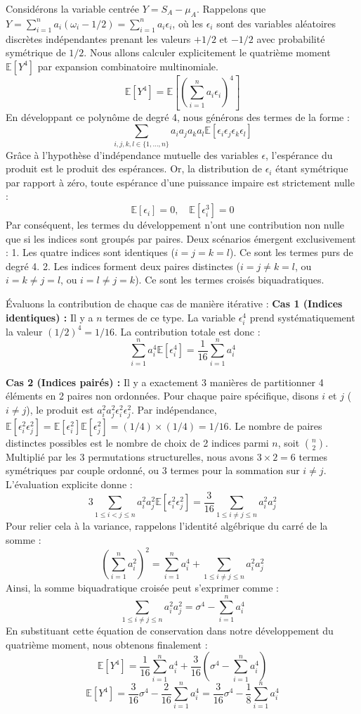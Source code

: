 \documentclass[12pt,a4paper]{article}
\begin{document}
Considérons la variable centrée $Y = S_A - \mu_A$.
Rappelons que $Y = \sum_{i=1}^n a_i (\omega_i - 1/2) = \sum_{i=1}^n a_i \epsilon_i$, où les $\epsilon_i$ sont des variables aléatoires discrètes indépendantes prenant les valeurs $+1/2$ et $-1/2$ avec probabilité symétrique de $1/2$.
Nous allons calculer explicitement le quatrième moment $\mathbb{E}[Y^4]$ par expansion combinatoire multinomiale.
$$ \mathbb{E}[Y^4] = \mathbb{E}\left[ \left( \sum_{i=1}^n a_i \epsilon_i \right)^4 \right] $$
En développant ce polynôme de degré 4, nous générons des termes de la forme :
$$ \sum_{i,j,k,l \in \{1,\dots,n\}} a_i a_j a_k a_l \mathbb{E}[\epsilon_i \epsilon_j \epsilon_k \epsilon_l] $$
Grâce à l'hypothèse d'indépendance mutuelle des variables $\epsilon$, l'espérance du produit est le produit des espérances. Or, la distribution de $\epsilon_i$ étant symétrique par rapport à zéro, toute espérance d'une puissance impaire est strictement nulle :
$$ \mathbb{E}[\epsilon_i] = 0, \quad \mathbb{E}[\epsilon_i^3] = 0 $$
Par conséquent, les termes du développement n'ont une contribution non nulle que si les indices sont groupés par paires. Deux scénarios émergent exclusivement :
1. Les quatre indices sont identiques ($i=j=k=l$). Ce sont les termes purs de degré 4.
2. Les indices forment deux paires distinctes ($i=j \neq k=l$, ou $i=k \neq j=l$, ou $i=l \neq j=k$). Ce sont les termes croisés biquadratiques.

Évaluons la contribution de chaque cas de manière itérative :
\textbf{Cas 1 (Indices identiques) :} Il y a $n$ termes de ce type. La variable $\epsilon_i^4$ prend systématiquement la valeur $(1/2)^4 = 1/16$.
La contribution totale est donc :
$$ \sum_{i=1}^n a_i^4 \mathbb{E}[\epsilon_i^4] = \frac{1}{16} \sum_{i=1}^n a_i^4 $$

\textbf{Cas 2 (Indices pairés) :} Il y a exactement 3 manières de partitionner 4 éléments en 2 paires non ordonnées. Pour chaque paire spécifique, disons $i$ et $j$ ($i \neq j$), le produit est $a_i^2 a_j^2 \epsilon_i^2 \epsilon_j^2$.
Par indépendance, $\mathbb{E}[\epsilon_i^2 \epsilon_j^2] = \mathbb{E}[\epsilon_i^2] \mathbb{E}[\epsilon_j^2] = (1/4) \times (1/4) = 1/16$.
Le nombre de paires distinctes possibles est le nombre de choix de 2 indices parmi $n$, soit $\binom{n}{2}$. Multiplié par les 3 permutations structurelles, nous avons $3 \times 2 = 6$ termes symétriques par couple ordonné, ou $3$ termes pour la sommation sur $i \neq j$.
L'évaluation explicite donne :
$$ 3 \sum_{1 \le i < j \le n} a_i^2 a_j^2 \mathbb{E}[\epsilon_i^2 \epsilon_j^2] = \frac{3}{16} \sum_{1 \le i \neq j \le n} a_i^2 a_j^2 $$
Pour relier cela à la variance, rappelons l'identité algébrique du carré de la somme :
$$ \left( \sum_{i=1}^n a_i^2 \right)^2 = \sum_{i=1}^n a_i^4 + \sum_{1 \le i \neq j \le n} a_i^2 a_j^2 $$
Ainsi, la somme biquadratique croisée peut s'exprimer comme :
$$ \sum_{1 \le i \neq j \le n} a_i^2 a_j^2 = \sigma^4 - \sum_{i=1}^n a_i^4 $$
En substituant cette équation de conservation dans notre développement du quatrième moment, nous obtenons finalement :
$$ \mathbb{E}[Y^4] = \frac{1}{16} \sum_{i=1}^n a_i^4 + \frac{3}{16} \left( \sigma^4 - \sum_{i=1}^n a_i^4 \right) $$
$$ \mathbb{E}[Y^4] = \frac{3}{16} \sigma^4 - \frac{2}{16} \sum_{i=1}^n a_i^4 = \frac{3}{16} \sigma^4 - \frac{1}{8} \sum_{i=1}^n a_i^4 $$
\end{document}
